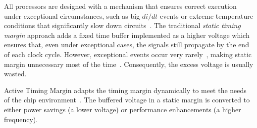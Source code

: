 
All processors are designed with a mechanism that ensures correct execution under exceptional circumstances, such as big $di/dt$ events or extreme temperature conditions that significantly slow down circuits~\cite{papadimitriou2017harnessing,tschanz2007adaptive,zu2016tistate}. The traditional \emph{static timing margin} approach adds a fixed time buffer implemented as a higher voltage which ensures that, even under exceptional cases, the signals still propagate by the end of each clock cycle. However, exceptional events occur very rarely~\cite{reddi2009voltage}, making static margin unnecessary most of the time~\cite{powell2003pipeline}. Consequently, the excess voltage is usually wasted.


Active Timing Margin adapts the timing margin dynamically to meet the needs of the chip environment~\cite{lefurgy2011active, tokunaga20145, bowman20158, vezyrtzis2018droop, zu2016tistate}. The buffered voltage in a static margin is converted to either power savings (a lower voltage) or performance enhancements (a higher frequency).

